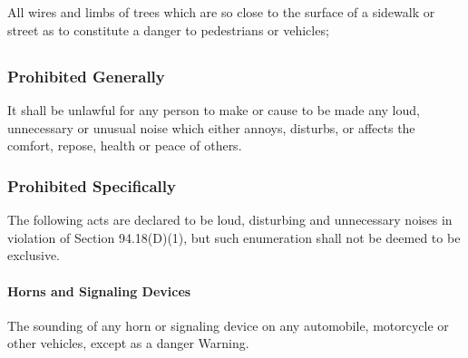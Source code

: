 \subsection{}
All wires and limbs of trees which are so close to the surface of a sidewalk or street as to constitute a danger to pedestrians or vehicles;
\subsection{}
\subsubsection{Prohibited Generally}
It shall be unlawful for any person to make or cause to be made any loud, unnecessary or unusual noise which either annoys, disturbs, or affects the comfort, repose, health or peace of others.
\subsubsection{Prohibited Specifically}
The following acts are declared to be loud, disturbing and unnecessary noises in violation of Section 94.18(D)(1), but such enumeration shall not be deemed to be exclusive.
\paragraph{Horns and Signaling Devices}
The sounding of any horn or signaling device on any automobile, motorcycle or other vehicles, except as a danger Warning.
